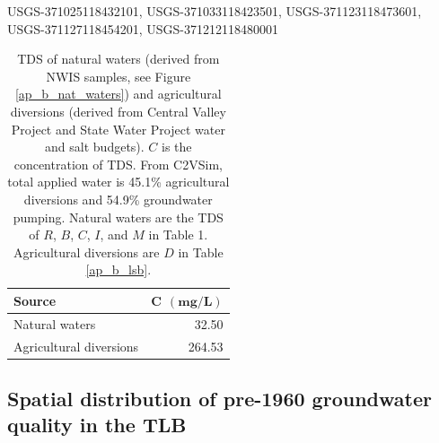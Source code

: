 \begin{changemargin}{0.5cm}{2.5cm}
USGS-371025118432101, USGS-371033118423501, USGS-371123118473601, USGS-371127118454201, USGS-371212118480001
\end{changemargin} 

\clearpage




\bgroup

\renewcommand{\arraystretch}{1.5}

\begin{table}[H]
	
	\caption{TDS of natural waters (derived from NWIS samples, see Figure \ref{ap_b_nat_waters}) and agricultural diversions (derived from Central Valley Project and State Water Project water and salt budgets). $C$ is the concentration of TDS. From C2VSim, total applied water is 45.1\% agricultural diversions and 54.9\% groundwater pumping. Natural waters are the TDS of $R$, $B$, $C$, $I$, and $M$ in Table 1. Agricultural diversions are $D$ in Table \ref{ap_b_lsb}.}
	\centering
	
	\begin{tabular}{lr}
		
		\textbf{Source} & $\bm{C \: \: (mg/L)}$ \\ 
		\hline
		Natural waters & 32.50 \\ 
		Agricultural diversions & 264.53 \\ 
		\hline
	\end{tabular}
	
	\label{ap_b_gw_and_sw_c_summary}
\end{table}

\egroup



\subsection{Spatial distribution of pre-1960 groundwater quality in the TLB}


